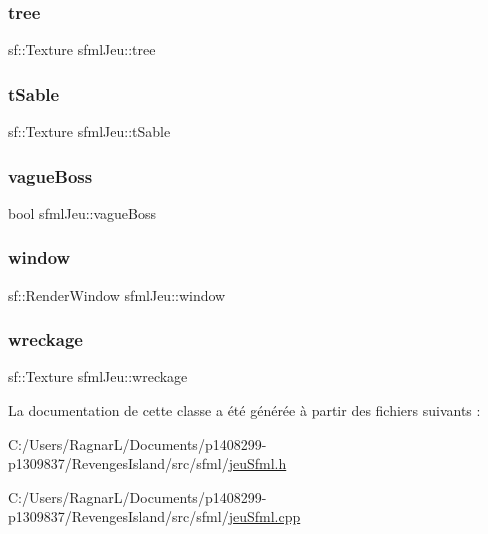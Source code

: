 \mbox{\label{classsfml_jeu_ac53f32205231b1555a312b5298ee024f}} 
\subsubsection{\texorpdfstring{tree}{tree}}
{\footnotesize\ttfamily sf\+::\+Texture sfml\+Jeu\+::tree}

\mbox{\label{classsfml_jeu_a0aa4898423487bb9d28188258b1907a8}} 
\subsubsection{\texorpdfstring{t\+Sable}{tSable}}
{\footnotesize\ttfamily sf\+::\+Texture sfml\+Jeu\+::t\+Sable}

\mbox{\label{classsfml_jeu_aecfcdbd46fd205fe344f4a1c41fbf175}} 
\subsubsection{\texorpdfstring{vague\+Boss}{vagueBoss}}
{\footnotesize\ttfamily bool sfml\+Jeu\+::vague\+Boss}

\mbox{\label{classsfml_jeu_ada6aaa97c0ed2b0eaa7c22a0368c00e8}} 
\subsubsection{\texorpdfstring{window}{window}}
{\footnotesize\ttfamily sf\+::\+Render\+Window sfml\+Jeu\+::window}

\mbox{\label{classsfml_jeu_a493f61a58fd454fcf6e1871a8a8999b6}} 
\subsubsection{\texorpdfstring{wreckage}{wreckage}}
{\footnotesize\ttfamily sf\+::\+Texture sfml\+Jeu\+::wreckage}



La documentation de cette classe a été générée à partir des fichiers suivants \+:\begin{DoxyCompactItemize}
\item 
C\+:/\+Users/\+Ragnar\+L/\+Documents/p1408299-\/p1309837/\+Revenges\+Island/src/sfml/\hyperlink{jeu_sfml_8h}{jeu\+Sfml.\+h}\item 
C\+:/\+Users/\+Ragnar\+L/\+Documents/p1408299-\/p1309837/\+Revenges\+Island/src/sfml/\hyperlink{jeu_sfml_8cpp}{jeu\+Sfml.\+cpp}\end{DoxyCompactItemize}
